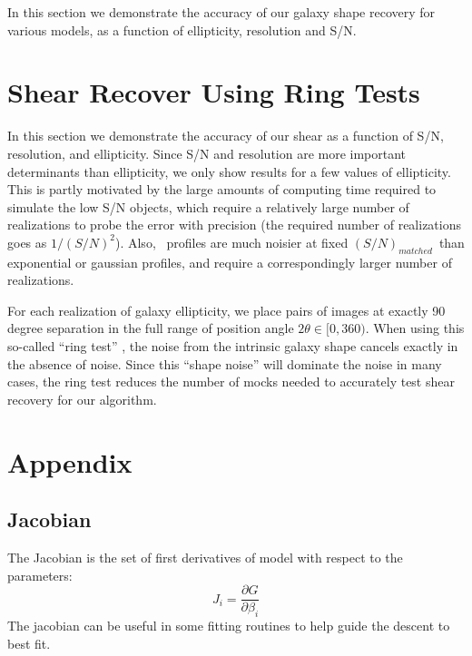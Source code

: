 \documentclass[12pt,preprint]{aastex}
\newcommand{\snmatch}{$(S/N)_{matched}$}
\begin{document}
In this section we demonstrate the accuracy of our galaxy shape recovery for
various models, as a function of ellipticity, resolution and S/N.

\section{Shear Recover Using Ring Tests}

In this section we demonstrate the accuracy of our shear as a function of S/N,
resolution, and ellipticity.  Since S/N and resolution are more important
determinants than ellipticity, we only show results for a few values of
ellipticity.  This is partly motivated by the large amounts of computing time
required to simulate the low S/N objects, which require a relatively large
number of realizations to probe the error with precision (the
required number of realizations goes as $1/(S/N)^2$).  Also, \devauc\ profiles
are much noisier at fixed \snmatch\ than exponential or gaussian profiles, 
and require a correspondingly larger number of realizations.

For each realization of galaxy ellipticity, we place pairs of images at exactly
90 degree separation in the full range of position angle $2 \theta \in
[0,360)$.  When using this so-called ``ring test'' \citep{Nakajima2007}, the
noise from the intrinsic galaxy shape cancels exactly in the absence of noise.
Since this ``shape noise'' will dominate the noise in many cases, the ring test
reduces the number of mocks needed to accurately test shear recovery for our
algorithm.





\appendix 

\section{Appendix}
\subsection{Jacobian}

The Jacobian is the set of first derivatives of model with respect
to the parameters:
\begin{equation}
J_i = \frac{\partial G}{\partial \beta_i}
\end{equation}
The jacobian can be useful in some fitting routines to help guide the descent
to best fit.
\end{document}
